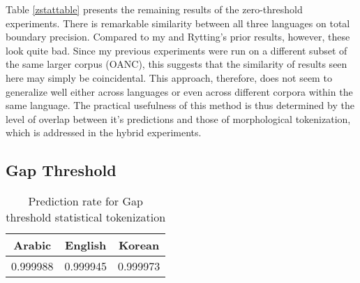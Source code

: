 Table \ref{zstattable} presents the remaining results of the zero-threshold experiments. There is remarkable similarity between all three languages on total boundary precision. Compared to my \cite{kearsley14} and Rytting's \cite{rytting04} prior results, however, these look quite bad. Since my previous experiments were run on a different subset of the same larger corpus (OANC), this suggests that the similarity of results seen here may simply be coincidental. This approach, therefore, does not seem to generalize well either across languages or even across different corpora within the same language. The practical usefulness of this method is thus determined by the level of overlap between it's predictions and those of morphological tokenization, which is addressed in the hybrid experiments.

\FloatBarrier

\subsection{Gap Threshold}
\FloatBarrier

\begin{table}
	\centering
	\begin{tabular}{| c | c | c |}
		\hline
		Arabic & English & Korean \\ \hline
		0.999988 & 0.999945 & 0.999973 \\ \hline
	\end{tabular}
	\caption{Prediction rate for Gap threshold statistical tokenization}
	\label{gpredtable}
\end{table}

